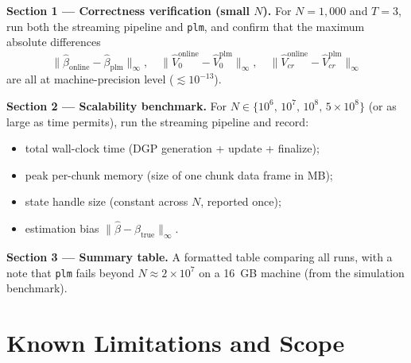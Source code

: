 \documentclass[11pt, a4paper]{article}
\begin{document}
\textbf{Section 1 --- Correctness verification (small $N$).}
For $N = 1{,}000$ and $T = 3$, run both the streaming pipeline and
\texttt{plm}, and confirm that the maximum absolute differences
\[
  \|\hat\beta_{\mathrm{online}} - \hat\beta_{\mathrm{plm}}\|_\infty,\quad
  \|\hat{V}_0^{\mathrm{online}} - \hat{V}_0^{\mathrm{plm}}\|_\infty,\quad
  \|\hat{V}_{cr}^{\mathrm{online}} - \hat{V}_{cr}^{\mathrm{plm}}\|_\infty
\]
are all at machine-precision level ($\lesssim 10^{-13}$).

\textbf{Section 2 --- Scalability benchmark.}
For $N \in \{10^6,\, 10^7,\, 10^8,\, 5 \times 10^8\}$ (or as large as time
permits), run the streaming pipeline and record:
\begin{itemize}
  \item total wall-clock time (DGP generation + update + finalize);
  \item peak per-chunk memory (size of one chunk data frame in MB);
  \item state handle size (constant across $N$, reported once);
  \item estimation bias $\|\hat\beta - \beta_{\mathrm{true}}\|_\infty$.
\end{itemize}

\textbf{Section 3 --- Summary table.}
A formatted table comparing all runs, with a note that \texttt{plm} fails
beyond $N \approx 2 \times 10^7$ on a 16~GB machine (from the simulation
benchmark).

\section{Known Limitations and Scope}
\end{document}
